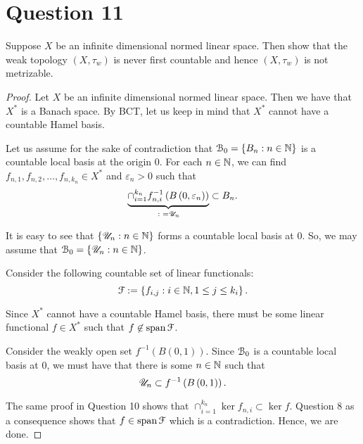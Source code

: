 \section{Question 11}
\horz

Suppose $X$ be an infinite dimensional normed linear space. Then show that the weak topology $(X,\tau_w)$ is never first countable and hence $(X,\tau_w)$ is not metrizable. 

\horz

\begin{proof}
    Let $X$ be an infinite dimensional normed linear space. Then we have that $X^{*}$ is a Banach space. By BCT, let us keep in mind that $X^{*}$ cannot have a countable Hamel basis.

    Let us assume for the sake of contradiction that ${\cal B} _{0}= \left\{ B_{n} : n\in \mathbb N \right\}$ is a countable local basis at the origin $0$. For each $n \in \mathbb N$, we can find $f_{n,1}, f_{n,2}, \ldots , f_{n, k_{n}} \in X^{*}$ and $\varepsilon_{n} > 0$ such that
    \begin{equation*}
	\underbrace{\cap_{i=1}^{k_{n}} f_{n,i}^{-1} \left( B \left( 0, \varepsilon_{n} \right) \right)}_{\colon = {\mathscr U}_{n}} \subset B_{n}.
    \end{equation*}

    It is easy to see that $\left\{ {\mathscr U}_{n} : n \in \mathbb N \right\}$ forms a countable local basis at $0$. So, we may assume that ${\cal B}_{0} = \left\{ {\mathscr U}_{n} : n\in \mathbb N \right\}$.

    Consider the following countable set of linear functionals:
    \begin{equation*}
	{\cal F}:=\left\{ f_{i,j} : i\in \mathbb N , 1\le j \le k_{i} \right\}.
    \end{equation*}
    
    Since $X^{*}$ cannot have a countable Hamel basis, there must be some linear functional $f\in X^{*}$ such that $f\not \in \operatorname{span} {\cal F}$. 

    Consider the weakly open set $f^{-1} \left( B\left( 0,1 \right) \right)$. Since ${\cal B}_{0}$ is a countable local basis at $0$, we must have that there is some $n\in \mathbb N$ such that
    \begin{equation*}
	{\mathscr U}_{n} \subset f^{-1} \left( B\left( 0,1 \right) \right).
    \end{equation*}

    The same proof in Question 10 shows that $\cap_{i=1}^{k_{n}} \ker f_{n,i} \subset \ker f$. Question 8 as a consequence shows that $f\in \operatorname{span} {\cal F}$ which is a contradiction. Hence, we are done.
\end{proof}
